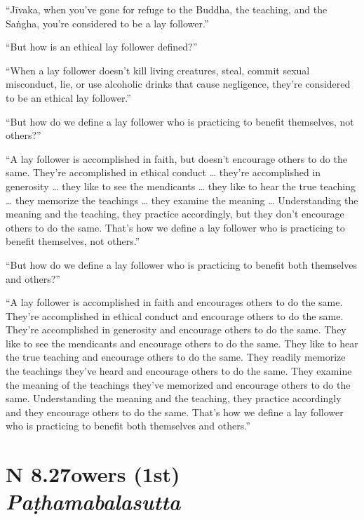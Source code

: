 \documentclass[12pt,openany]{book}%
\newcommand*{\suttatitleacronym}[1]{\smaller[2]{#1}\vspace*{.3em}}
\newcommand*{\suttatitletranslation}[1]{\linebreak{#1}}
\newcommand*{\suttatitleroot}[1]{\linebreak\smaller[2]\itshape{#1}}
\newcommand*{\tocacronym}[1]{\hspace*{-3.3em}{#1}\quad}
\newcommand*{\toctranslation}[1]{#1}
\newcommand*{\tocroot}[1]{(\textit{#1})}
\begin{document}
“\textsanskrit{Jīvaka}, when you’ve gone for refuge to the Buddha, the teaching, and the \textsanskrit{Saṅgha}, you’re considered to be a lay follower.” 

“But how is an ethical lay follower defined?” 

“When a lay follower doesn’t kill living creatures, steal, commit sexual misconduct, lie, or use alcoholic drinks that cause negligence, they’re considered to be an ethical lay follower.” 

“But how do we define a lay follower who is practicing to benefit themselves, not others?” 

“A lay follower is accomplished in faith, but doesn’t encourage others to do the same. They’re accomplished in ethical conduct … they’re accomplished in generosity … they like to see the mendicants … they like to hear the true teaching … they memorize the teachings … they examine the meaning … Understanding the meaning and the teaching, they practice accordingly, but they don’t encourage others to do the same. That’s how we define a lay follower who is practicing to benefit themselves, not others.” 

“But how do we define a lay follower who is practicing to benefit both themselves and others?” 

“A lay follower is accomplished in faith and encourages others to do the same. They’re accomplished in ethical conduct and encourage others to do the same. They’re accomplished in generosity and encourage others to do the same. They like to see the mendicants and encourage others to do the same. They like to hear the true teaching and encourage others to do the same. They readily memorize the teachings they’ve heard and encourage others to do the same. They examine the meaning of the teachings they’ve memorized and encourage others to do the same. Understanding the meaning and the teaching, they practice accordingly and they encourage others to do the same. That’s how we define a lay follower who is practicing to benefit both themselves and others.” 

%
\section*{{\suttatitleacronym AN 8.27}{\suttatitletranslation Powers (1st) }{\suttatitleroot Paṭhamabalasutta}}
\addcontentsline{toc}{section}{\tocacronym{AN 8.27} \toctranslation{Powers (1st) } \tocroot{Paṭhamabalasutta}}
\end{document}
